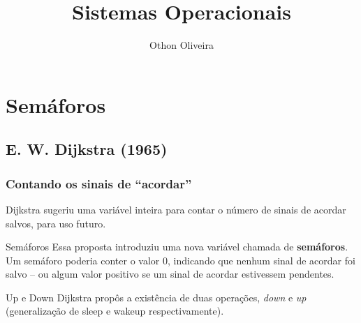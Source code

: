 \documentclass[11pt]{beamer}
\author{Othon Oliveira}
\title{Sistemas Operacionais}
\institute{Fatec -- Faculdade de Informática --- PE}
\begin{document}
\newcommand{\capa}{
    \begin{tikzpicture}[remember picture,overlay]
        \node at (current page.south west)
            {\begin{tikzpicture}[remember picture, overlay]
                \fill[shading=radial,top color=orange,bottom color=orange,middle color=yellow] (0,0) rectangle (\paperwidth,\paperheight);
            \end{tikzpicture}
          };
    \end{tikzpicture}
}




\begin{frame}
\titlepage
\end{frame}

\begin{frame}
\tableofcontents
\end{frame}



\section{ Semáforos}
\subsection*{ E. W. Dijkstra (1965)}

\begin{frame}\frametitle{ Contando os sinais de ``acordar''}
 Dijkstra sugeriu uma variável inteira para contar o número de sinais de acordar salvos, para uso futuro.
 
\pause
\begin{block}{ Semáforos}
  Essa proposta introduziu uma nova variável chamada de \textbf{semáforos}. Um semáforo poderia conter o valor 0, indicando que nenhum sinal 
  de acordar foi salvo -- ou algum valor positivo se um sinal de acordar estivessem pendentes.
\end{block}
 
 \pause
\begin{block}{ Up e Down}
 Dijkstra propôs a existência de duas operações, \textit{down} e \textit{up} (generalização de sleep e wakeup respectivamente). 
\end{block}
 
\end{frame}
\end{document}
